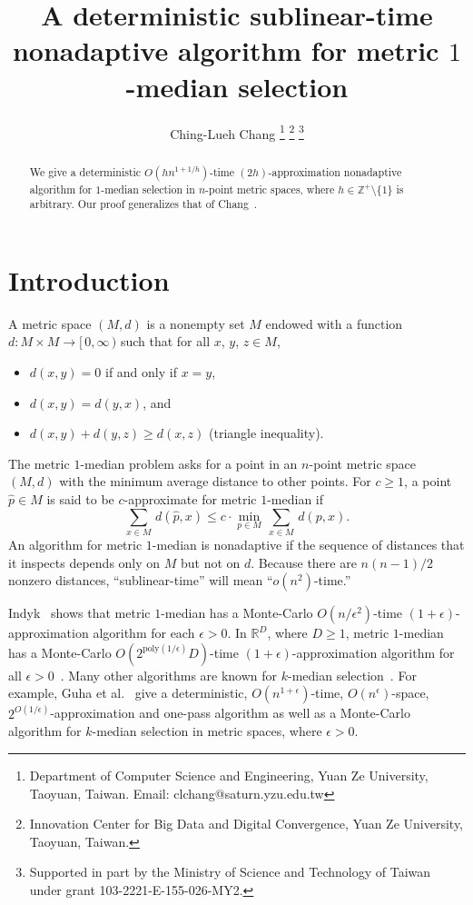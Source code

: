 \documentclass[letterpaper,12pt]{article}
\begin{document}
\title{A deterministic sublinear-time
nonadaptive
algorithm for metric
$1$-median selection}

\author{
Ching-Lueh Chang \footnote{Department of Computer Science and
Engineering,
Yuan Ze University, Taoyuan, Taiwan. Email:
clchang@saturn.yzu.edu.tw}
\footnote{Innovation Center for Big Data and Digital Convergence,
Yuan Ze University, Taoyuan, Taiwan.}
\footnote{Supported in part by the Ministry of Science and Technology
of Taiwan under
grant
103-2221-E-155-026-MY2.}
}


\maketitle

\begin{abstract}
We
give
a deterministic $O(hn^{1+1/h})$-time $(2h)$-approximation
nonadaptive
algorithm for $1$-median selection in
$n$-point metric
spaces,
where
$h\in\mathbb{Z}^+\setminus\{1\}$ is arbitrary.
Our proof generalizes that of Chang~\cite{Cha13}.
\end{abstract}


\section{Introduction}

A metric space $(M,d)$ is a nonempty set $M$
endowed with a function $d\colon M\times M\to[\,0,\infty\,)$ such that
for all $x$, $y$, $z\in M$,
\begin{itemize}
\item $d(x,y)=0$ if and only if $x=y$,
\item $d(x,y)=d(y,x)$,
and
\item $d(x,y)+d(y,z)\ge d(x,z)$ (triangle inequality).
\end{itemize}
The
{\sc metric $1$-median}
problem asks for a point in
an $n$-point
metric space
$(M,d)$
with the minimum average distance to other points.
For $c\ge 1$,
a point
$\hat{p}\in M$
is said to be $c$-approximate for {\sc metric $1$-median} if
$$
\sum_{x\in M}\,d\left(\hat{p},x\right)
\le c\cdot
\min_{p\in M}\,
\sum_{x\in M}\,d\left(p,x\right).
$$
An algorithm for {\sc metric $1$-median} is nonadaptive
if the sequence of distances that it inspects
depends only on $M$ but not on $d$.
Because there are $n(n-1)/2$ nonzero distances,
``sublinear-time'' will mean ``$o(n^2)$-time.''



Indyk~\cite{Ind99, Ind00} shows that {\sc metric $1$-median} has a
Monte-Carlo $O(n/\epsilon^2)$-time $(1+\epsilon)$-approximation algorithm
for each $\epsilon>0$.
In $\mathbb{R}^D$,
where $D\ge1$,
{\sc metric $1$-median} has a
Monte-Carlo $O(2^{\text{poly}(1/\epsilon)}D)$-time
$(1+\epsilon)$-approximation algorithm for all $\epsilon>0$~\cite{KSS10}.
Many other algorithms are known for $k$-median
selection~\cite{GMMMO03, KSS10, ABS10}.
For example,
Guha et al.~\cite{GMMMO03}
give
a deterministic, $O(n^{1+\epsilon})$-time, $O(n^\epsilon)$-space,
$2^{O(1/\epsilon)}$-approximation
and one-pass
algorithm as well as a Monte-Carlo algorithm for $k$-median
selection in metric spaces, where $\epsilon>0$.
\end{document}
